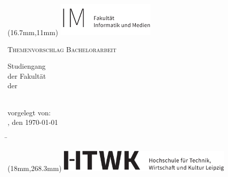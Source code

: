 

\begin{titlepage}
	\noindent
\begin{textblock*}{4.74cm}(16.7mm,11mm)
\includegraphics[width=4.74cm]{anlagen/bilder/logos/HTWK-Fakultaetszusatz_IM_schwarz_de-eps-converted-to.pdf}
\end{textblock*}
\begin{center}

\vspace*{0.5cm}

\large
{\textsc{Themenvorschlag Bachelorarbeit}}

Studiengang \studiengang\\
der Fakultät \fakultaet\\
der \hochschule\ \ort \newline\\

{\LARGE \textbf{\titel}}\\
{\LARGE \textbf{\subtitel}}

\end{center}


\vspace*{2cm}
vorgelegt von: \autor\\
\ort, den \today


\vspace*{1cm}
\large
\begin{tabbing}
\hspace{4cm}\=\kill
\end{tabbing} 

\begin{textblock*}{8.41cm}(18mm,268.3mm)
\includegraphics[width=8.41cm]{anlagen/bilder/logos/htwk-logo-eps-converted-to.pdf}
\end{textblock*}

\end{titlepage}
